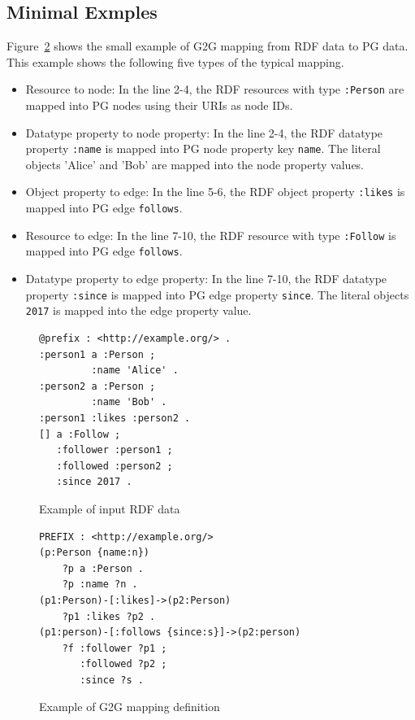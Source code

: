 \documentclass[runningheads]{llncs}
\begin{document}
\subsection{Minimal Exmples}
Figure~\ref{fig:example-g2g} shows the small example of G2G mapping from RDF data to PG data. This example shows the following five types of the typical mapping.

\begin{itemize}
    \item Resource to node: In the line 2-4, the RDF resources with type \texttt{:Person} are mapped into PG nodes using their URIs as node IDs.
    \item Datatype property to node property: In the line 2-4, the RDF datatype property \texttt{:name} is mapped into PG node property key \texttt{name}. The literal objects 'Alice' and 'Bob' are mapped into the node property values.
    \item Object property to edge: In the line 5-6, the RDF object property \texttt{:likes} is mapped into PG edge \texttt{follows}. 
    \item Resource to edge: In the line 7-10, the RDF resource with type \texttt{:Follow} is mapped into PG edge \texttt{follows}. 
    \item Datatype property to edge property: In the line 7-10, the RDF datatype property \texttt{:since} is mapped into PG edge property \texttt{since}. The literal objects \texttt{2017} is mapped into the edge property value.
\end{itemize}

\begin{figure}[!t]
\begin{scriptsize}
\begin{verbatim}
@prefix : <http://example.org/> .
:person1 a :Person ;
         :name 'Alice' .
:person2 a :Person ;
         :name 'Bob' .
:person1 :likes :person2 .
[] a :Follow ;
   :follower :person1 ;
   :followed :person2 ;
   :since 2017 .
\end{verbatim}
\end{scriptsize}
\caption{Example of input RDF data}
\label{fig:example-rdf}
\end{figure}


\begin{figure}[!t]
\begin{scriptsize}
\begin{verbatim}
PREFIX : <http://example.org/>
(p:Person {name:n})
    ?p a :Person .
    ?p :name ?n .
(p1:Person)-[:likes]->(p2:Person)
    ?p1 :likes ?p2 .
(p1:person)-[:follows {since:s}]->(p2:person)
    ?f :follower ?p1 ;
       :followed ?p2 ;
       :since ?s .
\end{verbatim}
\end{scriptsize}
\caption{Example of G2G mapping definition}
\label{fig:example-g2g}
\end{figure}
\end{document}
